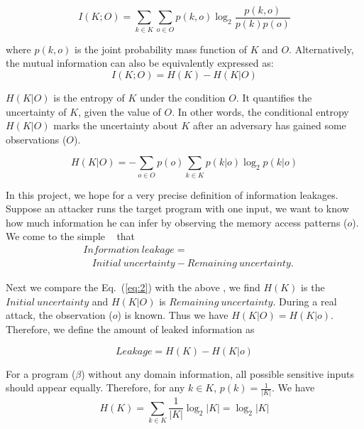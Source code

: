 \begin{equation} \label{eq:1}
    I(K;O) = \sum_{k {\in} K}{\sum_{o {\in} O}{p(k, o)\log_2\frac{p(k, o)}{p(k)p(o)}}}
\end{equation}

where $p(k, o)$ is the joint probability mass function of $K$ and $O$.
Alternatively, the mutual information can also be equivalently expressed as:
\begin{equation} \label{eq:2}
    I(K;O) = H(K) - H(K|O)
\end{equation}

$H(K|O)$ is the entropy of $K$ under the condition $O$. It quantifies the
uncertainty of $K$, given the value of $O$. In other words, the conditional 
entropy $H(K|O)$ marks the uncertainty about $K$ after an adversary has 
gained some observations ($O$).

\begin{equation}
    H(K|O) = - \sum_{o {\in} O} {p(o) \sum_{k {\in} K}{p(k|o)\log_2p(k|o)}}
\end{equation}

In this project, we hope for a very precise definition of information
leakages. Suppose an attacker runs the target program with one
input, we want to know how much information he can infer by observing the
memory access patterns ($o$). We come to the simple 
~\cite{10.1007/978-3-642-00596-1_21,AskarovC12} %
that
\begin{align*}
     & \mathit{Information\ leakage} =                                         \\
     & ~~~~ \mathit{Initial\ uncertainty} - \mathit{Remaining\ uncertainty}.
\end{align*}

Next we compare the Eq.~(\ref{eq:2}) with the above , we find $H(K)$
is the $\mathit{Initial\ uncertainty}$ and $H(K|O)$ is $\mathit{Remaining\
uncertainty}$. During a real attack, the observation ($o$) is known. Thus we
have $H(K|O) = H(K|o)$. Therefore, we define the amount of leaked information as

\begin{displaymath}
    Leakage = H(K) - H(K|o)
\end{displaymath}

For a program ($\beta$) without any domain information, all possible sensitive
inputs should appear equally. Therefore, for any $k \in K$, $p(k) =
\frac{1}{|K|}$. We have
$$H(K) = \sum_{k {\in} K}\frac{1}{|K|}\log_2{|K|} = \log_2{|K|}$$

